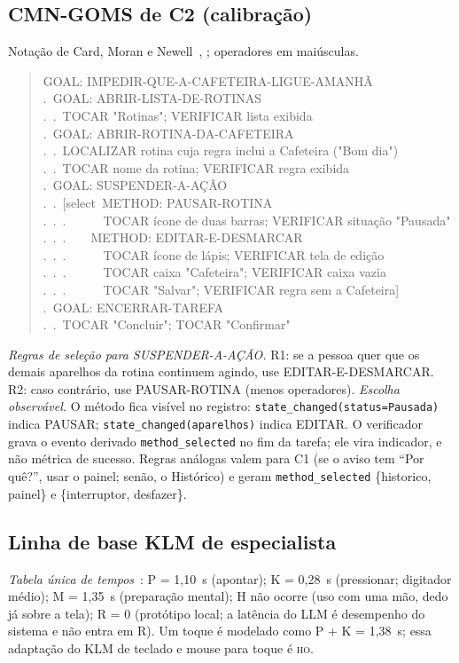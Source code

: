 \documentclass[conference,onecolumn]{IEEEtran}
\newcommand{\stHO}{\textsc{ho}}
\newcommand{\ev}[1]{\texttt{#1}}
\begin{document}
\subsection{CMN-GOMS de C2 (calibração)}
Notação de Card, Moran e Newell~\cite{card1983}, \cite[cap.~12]{dix2004}; operadores em maiúsculas.

\begin{quote}\footnotesize\ttfamily
GOAL: IMPEDIR-QUE-A-CAFETEIRA-LIGUE-AMANHÃ\\
.\ GOAL: ABRIR-LISTA-DE-ROTINAS\\
.\ .\ TOCAR "Rotinas"; VERIFICAR lista exibida\\
.\ GOAL: ABRIR-ROTINA-DA-CAFETEIRA\\
.\ .\ LOCALIZAR rotina cuja regra inclui a Cafeteira ("Bom dia")\\
.\ .\ TOCAR nome da rotina; VERIFICAR regra exibida\\
.\ GOAL: SUSPENDER-A-AÇÃO\\
.\ .\ [select\ METHOD: PAUSAR-ROTINA\\
.\ .\ .\ \ \ \ \ \ TOCAR ícone de duas barras; VERIFICAR situação "Pausada"\\
.\ .\ .\ \ \ \ METHOD: EDITAR-E-DESMARCAR\\
.\ .\ .\ \ \ \ \ \ TOCAR ícone de lápis; VERIFICAR tela de edição\\
.\ .\ .\ \ \ \ \ \ TOCAR caixa "Cafeteira"; VERIFICAR caixa vazia\\
.\ .\ .\ \ \ \ \ \ TOCAR "Salvar"; VERIFICAR regra sem a Cafeteira]\\
.\ GOAL: ENCERRAR-TAREFA\\
.\ .\ TOCAR "Concluir"; TOCAR "Confirmar"
\end{quote}
\textit{Regras de seleção para SUSPENDER-A-AÇÃO.} R1: se a pessoa quer que os demais aparelhos da rotina continuem agindo, use EDITAR-E-DESMARCAR. R2: caso contrário, use PAUSAR-ROTINA (menos operadores). \textit{Escolha observável.} O método fica visível no registro: \ev{state\_changed(status=Pausada)} indica PAUSAR; \ev{state\_changed(aparelhos)} indica EDITAR. O verificador grava o evento derivado \ev{method\_selected} no fim da tarefa; ele vira indicador, e não métrica de sucesso. Regras análogas valem para C1 (se o aviso tem ``Por quê?'', usar o painel; senão, o Histórico) e geram \ev{method\_selected} \{historico, painel\} e \{interruptor, desfazer\}.

\subsection{Linha de base KLM de especialista}\label{sec:klm}
\textit{Tabela única de tempos}~\cite{card1980}: P = 1,10~s (apontar); K = 0,28~s (pressionar; digitador médio); M = 1,35~s (preparação mental); H não ocorre (uso com uma mão, dedo já sobre a tela); R = 0 (protótipo local; a latência do LLM é desempenho do sistema e não entra em R). Um toque é modelado como P + K = 1,38~s; essa adaptação do KLM de teclado e mouse para toque é \stHO.
\end{document}
